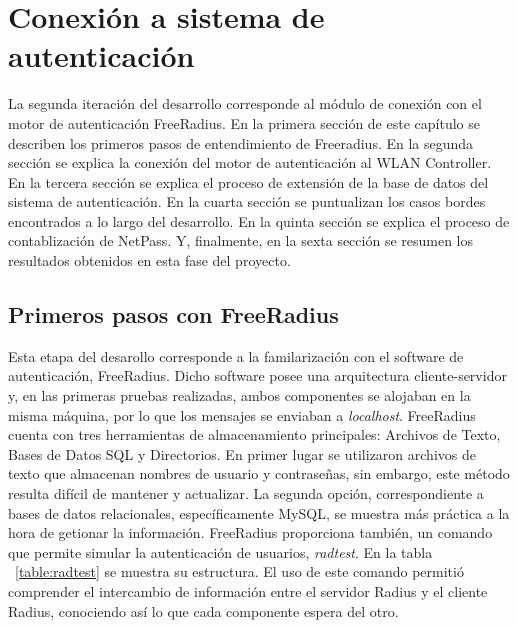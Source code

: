 \chapter{Conexión a sistema de autenticación}\label{chapter:Conexion a FreeRadius}

		La segunda iteración del desarrollo corresponde al módulo de conexión con el motor de autenticación FreeRadius. En la primera sección de este capítulo se describen los primeros pasos de entendimiento de Freeradius. En la segunda sección se explica la conexión del motor de autenticación al WLAN Controller. En la tercera sección se explica el proceso de extensión de la base de datos del sistema de autenticación. En la cuarta sección se puntualizan los casos bordes encontrados a lo largo del desarrollo. En la quinta sección se explica el proceso de contablización de NetPass. Y, finalmente, en la sexta sección se resumen los resultados obtenidos en esta fase del proyecto.

\section{Primeros pasos con FreeRadius} \label{sect:Primeros pasos con FreeRadius}
		Esta etapa del desarollo corresponde a la familarización con el software de autenticación, FreeRadius. Dicho software posee una arquitectura cliente-servidor y, en las primeras pruebas realizadas, ambos componentes se alojaban en la misma máquina, por lo que los mensajes se enviaban a \textit{localhost}.
\newline		
\newline
\indent FreeRadius cuenta con tres herramientas de almacenamiento principales: Archivos de Texto, Bases de Datos SQL y Directorios. En primer lugar se utilizaron archivos de texto que almacenan nombres de usuario y contraseñas, sin embargo, este método resulta difícil de mantener y actualizar. La segunda opción, correspondiente a bases de datos relacionales, específicamente MySQL, se muestra más práctica a la hora de getionar la información. 
\newline
\newline
\indent FreeRadius proporciona también, un comando que permite simular la autenticación de usuarios, \textit{radtest}. En la tabla ~\ref{table:radtest} se muestra su estructura. El uso de este comando permitió comprender el intercambio de información entre el servidor Radius y el cliente Radius, conociendo así lo que cada componente espera del otro.
\newline


